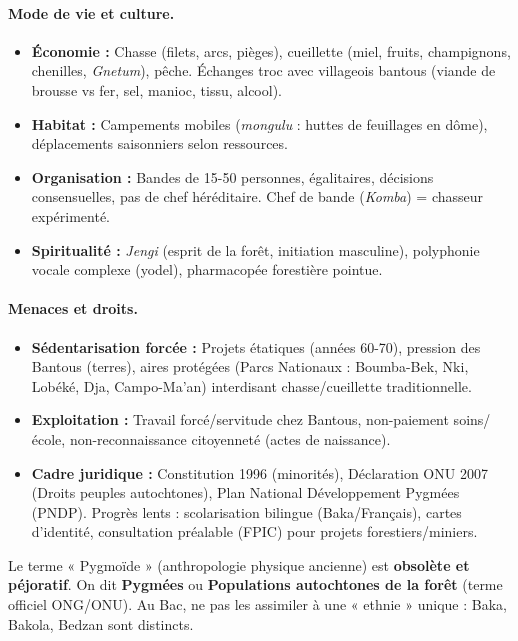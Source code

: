 \documentclass[11pt]{article}
\begin{document}
\paragraph{Mode de vie et culture.}
\begin{itemize}
    \item \textbf{Économie :} Chasse (filets, arcs, pièges), cueillette (miel, fruits, champignons, chenilles, \emph{Gnetum}), pêche. Échanges troc avec villageois bantous (viande de brousse vs fer, sel, manioc, tissu, alcool).
    \item \textbf{Habitat :} Campements mobiles (\emph{mongulu} : huttes de feuillages en dôme), déplacements saisonniers selon ressources.
    \item \textbf{Organisation :} Bandes de 15-50 personnes, égalitaires, décisions consensuelles, pas de chef héréditaire. Chef de bande (\emph{Komba}) = chasseur expérimenté.
    \item \textbf{Spiritualité :} \emph{Jengi} (esprit de la forêt, initiation masculine), polyphonie vocale complexe (yodel), pharmacopée forestière pointue.
\end{itemize}

\paragraph{Menaces et droits.}
\begin{itemize}
    \item \textbf{Sédentarisation forcée :} Projets étatiques (années 60-70), pression des Bantous (terres), aires protégées (Parcs Nationaux : Boumba-Bek, Nki, Lobéké, Dja, Campo-Ma'an) interdisant chasse/cueillette traditionnelle.
    \item \textbf{Exploitation :} Travail forcé/servitude chez Bantous, non-paiement soins/école, non-reconnaissance citoyenneté (actes de naissance).
    \item \textbf{Cadre juridique :} Constitution 1996 (minorités), Déclaration ONU 2007 (Droits peuples autochtones), Plan National Développement Pygmées (PNDP). Progrès lents : scolarisation bilingue (Baka/Français), cartes d'identité, consultation préalable (FPIC) pour projets forestiers/miniers.
\end{itemize}

\begin{attention}
Le terme « Pygmoïde » (anthropologie physique ancienne) est \textbf{obsolète et péjoratif}. On dit \textbf{Pygmées} ou \textbf{Populations autochtones de la forêt} (terme officiel ONG/ONU). Au Bac, ne pas les assimiler à une « ethnie » unique : Baka, Bakola, Bedzan sont distincts.
\end{attention}
\end{document}
